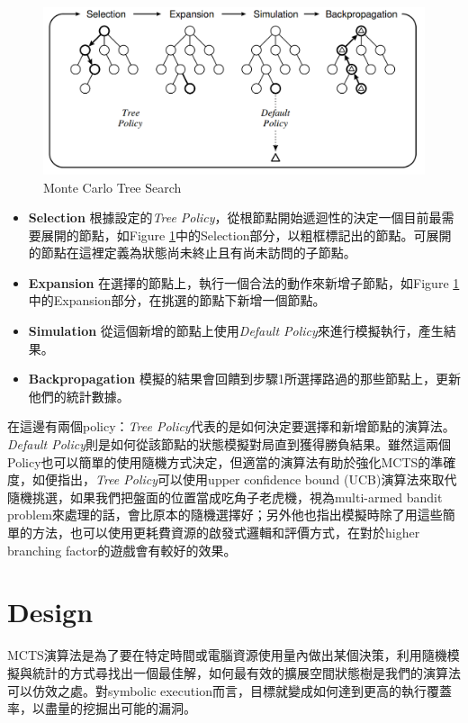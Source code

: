 \documentclass[12pt,a4paper,oneside]{book}
\begin{document}
\begin{figure}[h]
\center
\includegraphics[width=\textwidth,height=\textheight,keepaspectratio]{figures/mcts2.PNG}
\caption{Monte Carlo Tree Search \label{figMCTS}}
\end{figure}

\begin{itemize}
\item \textbf{Selection} 根據設定的\textit{Tree Policy}，從根節點開始遞迴性的決定一個目前最需要展開的節點，如Figure \ref{figMCTS}中的Selection部分，以粗框標記出的節點。可展開的節點在這裡定義為狀態尚未終止且有尚未訪問的子節點。
\item \textbf{Expansion} 在選擇的節點上，執行一個合法的動作來新增子節點，如Figure \ref{figMCTS}中的Expansion部分，在挑選的節點下新增一個節點。
\item \textbf{Simulation} 從這個新增的節點上使用\textit{Default Policy}來進行模擬執行，產生結果。
\item \textbf{Backpropagation} 模擬的結果會回饋到步驟1所選擇路過的那些節點上，更新他們的統計數據。
\end{itemize}

在這邊有兩個policy：\textit{Tree Policy}代表的是如何決定要選擇和新增節點的演算法。\textit{Default Policy}則是如何從該節點的狀態模擬對局直到獲得勝負結果。雖然這兩個Policy也可以簡單的使用隨機方式決定，但適當的演算法有助於強化MCTS的準確度，如\cite{Intro2MCTS}便指出，\textit{Tree Policy}可以使用upper confidence bound (UCB)演算法來取代隨機挑選，如果我們把盤面的位置當成吃角子老虎機，視為multi-armed bandit problem來處理的話，會比原本的隨機選擇好；另外他也指出模擬時除了用這些簡單的方法，也可以使用更耗費資源的啟發式邏輯和評價方式，在對於higher branching factor的遊戲會有較好的效果。

\chapter{Design}

MCTS演算法是為了要在特定時間或電腦資源使用量內做出某個決策，利用隨機模擬與統計的方式尋找出一個最佳解，如何最有效的擴展空間狀態樹是我們的演算法可以仿效之處。對symbolic execution而言，目標就變成如何達到更高的執行覆蓋率，以盡量的挖掘出可能的漏洞。
\end{document}

